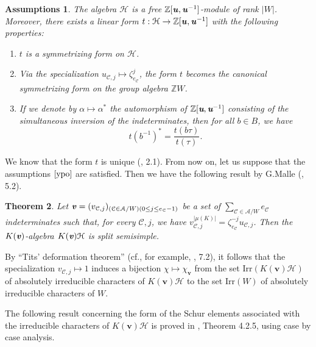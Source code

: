 \documentclass[10pt,a4paper,titlepage]{article}
\newtheorem{theorem}{Theorem}[section]
\newtheorem{ypoth}[theorem]{Assumptions}
\begin{document}
\begin{ypoth}\label{ypo}
The algebra $\mathcal{H}$ is a free
$\mathbb{Z}[\textbf{\emph{u}},\textbf{\emph{u}}^{-1}]$-module of
rank $|W|$. Moreover, there exists a linear form
$t:\mathcal{H}\rightarrow
\mathbb{Z}[\textbf{\emph{u}},\textbf{\emph{u}}^{-1}]$ with the
following properties:
\begin{enumerate}[(1)]
    \item $t$ is a symmetrizing form on $\mathcal{H}$.
    \item Via the specialization $u_{\mathcal{C},j} \mapsto
     \zeta_{e_\mathcal{C}}^j$, the form $t$ becomes the canonical
     symmetrizing form on the group algebra $\mathbb{Z}W$.
    \item If we denote by $\alpha \mapsto \alpha^*$ the automorphism of
     $\mathbb{Z}[\emph{\textbf{u}},\emph{\textbf{u}}^{-1}]$ consisting of the
     simultaneous inversion of the indeterminates, then for all $b \in B$, we
     have
          $$t(b^{-1})^*=\frac{t(b\tau)}{t(\tau)}.$$
\end{enumerate}
\end{ypoth}

We know that the form $t$ is unique (\cite{BMM2}, 2.1). From now on,
let us suppose that the assumptions $\ref{ypo}$ are satisfied. Then
we have the following result by G.Malle (\cite{Ma4}, 5.2).

\begin{theorem}\label{Semisimplicity Malle}
Let $\textbf{\emph{v}}=(v_{\mathcal{C},j})_{(\mathcal{C} \in
\mathcal{A}/W)(0\leq j \leq e_{\mathcal{C}}-1)}$ be a set of
$\sum_{\mathcal{C} \in \mathcal{A}/W}e_{\mathcal{C}}$ indeterminates
such that, for every $\mathcal{C},j$, we have
$v_{\mathcal{C},j}^{|\mu(K)|}=\zeta_{e_\mathcal{C}}^{-j}u_{\mathcal{C},j}$.
Then the $K(\textbf{\emph{v}})$-algebra
$K(\textbf{\emph{v}})\mathcal{H}$ is split semisimple.
\end{theorem}

By ``Tits' deformation theorem'' (cf., for example, \cite{BMM2}, 7.2), it follows
that the specialization $v_{\mathcal{C},j}\mapsto 1$ induces a
bijection $\chi \mapsto \chi_{\textbf{v}}$ from the
set $\mathrm{Irr}(K(\textbf{v})\mathcal{H})$ of absolutely
irreducible characters of $K(\textbf{v})\mathcal{H}$ to the set
$\mathrm{Irr}(W)$ of absolutely irreducible characters of $W$.

The following result concerning the form of the Schur elements associated
with the irreducible characters of $K(\textbf{v})\mathcal{H}$ is proved in \cite{Chlou}, Theorem 4.2.5, using case by case analysis.
\end{document}
